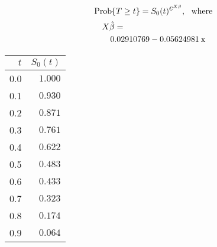 \[{\rm Prob}\{T\geq t\} = S_{0}(t)^{{\textstyle e}^{X\beta}}, {\rm \ \ where} \\ \]
\begin{eqnarray*}
\lefteqn{X\hat{\beta}=}\\
& & 0.02910769 -0.05624981\:{\rm x} \\
\end{eqnarray*}
%
\begin{center}
 \begin{tabular}{rr}\hline\hline
\multicolumn{1}{r}{$t$}&\multicolumn{1}{c}{$S_{0}(t)$}\tabularnewline
\hline
0.0&$1.000$\tabularnewline
0.1&$0.930$\tabularnewline
0.2&$0.871$\tabularnewline
0.3&$0.761$\tabularnewline
0.4&$0.622$\tabularnewline
0.5&$0.483$\tabularnewline
0.6&$0.433$\tabularnewline
0.7&$0.323$\tabularnewline
0.8&$0.174$\tabularnewline
0.9&$0.064$\tabularnewline
\hline
\end{tabular}

\end{center}

